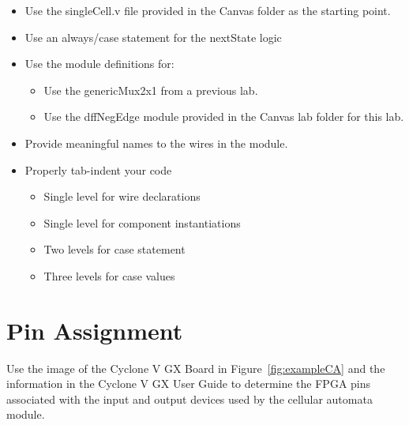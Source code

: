 \begin{itemize}
\item
  Use the singleCell.v file provided in the Canvas folder as the
  starting point.
\item
  Use an always/case statement for the nextState logic
\item
  Use the module definitions for:

  \begin{itemize}
  \item
    Use the genericMux2x1 from a previous lab.
  \item
    Use the dffNegEdge module provided in the Canvas lab folder for this
    lab.
  \end{itemize}
\item
  Provide meaningful names to the wires in the module.
\item
  Properly tab-indent your code

  \begin{itemize}
  \item
    Single level for wire declarations
  \item
    Single level for component instantiations
  \item
    Two levels for case statement
  \item
    Three levels for case values
  \end{itemize}
\end{itemize}

\hypertarget{pin-assignment}{%
\section{Pin Assignment}\label{pin-assignment}}

Use the image of the Cyclone V GX Board in Figure~\ref{fig:exampleCA} 
and the information
in the Cyclone V GX User Guide to determine the FPGA pins associated
with the input and output devices used by the cellular automata module.

